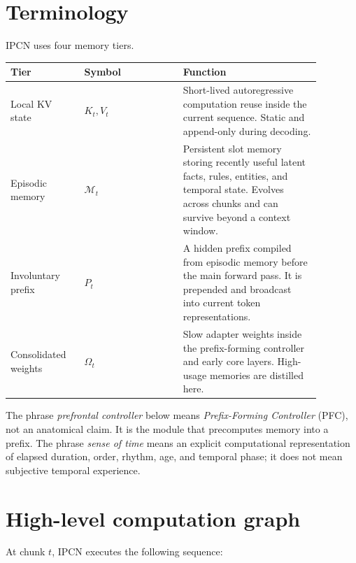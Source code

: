 \documentclass[11pt]{article}
\newcommand{\Mem}{\mathcal{M}}
\begin{document}
\section{Terminology}

IPCN uses four memory tiers.

\begin{longtable}{p{0.20\linewidth}p{0.29\linewidth}p{0.39\linewidth}}
\toprule
\textbf{Tier} & \textbf{Symbol} & \textbf{Function} \\
\midrule
Local KV state & \(K_t,V_t\) & Short-lived autoregressive computation reuse inside the current sequence. Static and append-only during decoding. \\
Episodic memory & \(\Mem_t\) & Persistent slot memory storing recently useful latent facts, rules, entities, and temporal state. Evolves across chunks and can survive beyond a context window. \\
Involuntary prefix & \(P_t\) & A hidden prefix compiled from episodic memory before the main forward pass. It is prepended and broadcast into current token representations. \\
Consolidated weights & \(\Omega_t\) & Slow adapter weights inside the prefix-forming controller and early core layers. High-usage memories are distilled here. \\
\bottomrule
\end{longtable}

The phrase \emph{prefrontal controller} below means \emph{Prefix-Forming Controller} (PFC), not an anatomical claim. It is the module that precomputes memory into a prefix. The phrase \emph{sense of time} means an explicit computational representation of elapsed duration, order, rhythm, age, and temporal phase; it does not mean subjective temporal experience.

\section{High-level computation graph}

At chunk \(t\), IPCN executes the following sequence:
\end{document}
